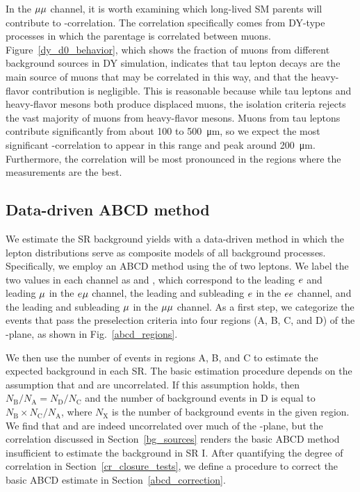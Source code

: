 In the ${\mu}{\mu}$ channel, it is worth examining which long-lived SM parents will contribute to \ad-\ad correlation. The correlation specifically comes from DY-type processes in which the parentage is correlated between muons. Figure~\ref{dy_d0_behavior}, which shows the fraction of muons from different background sources in DY simulation, indicates that tau lepton decays are the main source of muons that may be correlated in this way, and that the heavy-flavor contribution is negligible. This is reasonable because while tau leptons and heavy-flavor mesons both produce displaced muons, the isolation criteria rejects the vast majority of muons from heavy-flavor mesons.  Muons from tau leptons contribute significantly from about \num{100} to \SI{500}{\um}, so we expect the most significant \ad-\ad correlation to appear in this range and peak around \SI{200}{\um}. Furthermore, the correlation will be most pronounced in the regions where the \ad measurements are the best.



\subsection{Data-driven ABCD method}
\label{abcd}
We estimate the SR background yields with a data-driven method in which the lepton \ad distributions serve as composite models of all background processes. Specifically, we employ an ABCD method using the \ad of two leptons. We label the two \ad values in each channel as \ada and \adb, which correspond to the leading $e$ and leading ${\mu}$ in the $e{\mu}$ channel, the leading and subleading $e$ in the $ee$ channel, and the leading and subleading ${\mu}$ in the ${\mu}{\mu}$ channel. As a first step, we categorize the events that pass the preselection criteria into four regions (A, B, C, and D) of the \ada-\adb plane, as shown in Fig.~\ref{abcd_regions}.



We then use the number of events in regions A, B, and C to estimate the expected background in each SR. The basic estimation procedure depends on the assumption that \ada and \adb are uncorrelated. If this assumption holds, then $N_{\text{B}}/N_{\text{A}}=N_{\text{D}}/N_{\text{C}}$ and the number of background events in D is equal to $N_{\text{B}}\times N_{\text{C}}/N_{\text{A}}$, where $N_{\text{X}}$ is the number of background events in the given region. We find that \ada and \adb are indeed uncorrelated over much of the \ad-\ad plane, but the correlation discussed in Section~\ref{bg_sources} renders the basic ABCD method insufficient to estimate the background in SR I. After quantifying the degree of correlation in Section~\ref{cr_closure_tests}, we define a procedure to correct the basic ABCD estimate in Section~\ref{abcd_correction}.

